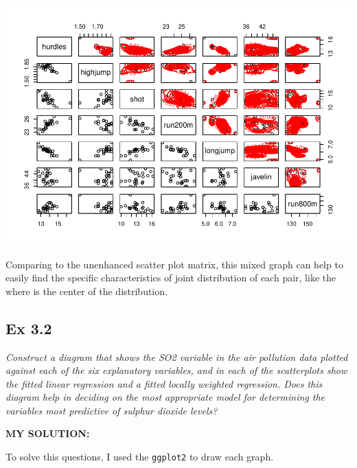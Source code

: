 \documentclass[
]{article}
\begin{document}
\includegraphics{HUDM6122-Homework_03-Chenguang-Pan_files/figure-latex/unnamed-chunk-1-1.pdf}

Comparing to the unenhanced scatter plot matrix, this mixed graph can
help to easily find the specific characteristics of joint distribution
of each pair, like the where is the center of the distribution.

\hypertarget{ex-3.2}{%
\subsection{Ex 3.2}\label{ex-3.2}}

\emph{Construct a diagram that shows the SO2 variable in the air
pollution data plotted against each of the six explanatory variables,
and in each of the scatterplots show the fitted linear regression and a
fitted locally weighted regression. Does this diagram help in deciding
on the most appropriate model for determining the variables most
predictive of sulphur dioxide levels?}

\textbf{MY SOLUTION:}

To solve this questions, I used the \texttt{ggplot2} to draw each graph.
\end{document}
